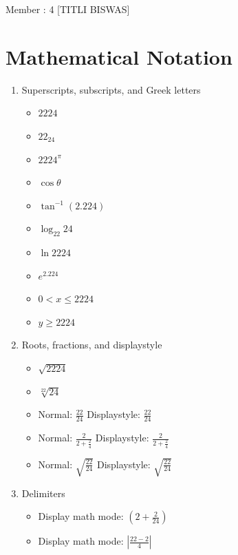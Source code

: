 \documentclass{article}
\begin{document}
\begin{center}
    {\LARGE Member : 4 [TITLI BISWAS]}
\end{center}

\section{Mathematical Notation}

\begin{enumerate}
    \item Superscripts, subscripts, and Greek letters
    \begin{itemize}
        \item $2224$
        \item $22_{24}$
        \item $2224^{\pi}$
        \item $\cos \theta$
        \item $\tan^{-1}(2.224)$
        \item $\log_{22}24$
        \item $\ln 2224$
        \item $e^{2.224}$
        \item $0 < x \leq 2224$
        \item $y \geq 2224$
    \end{itemize}

    \item Roots, fractions, and displaystyle
    \begin{itemize}
        \item $\sqrt{2224}$
        \item $\sqrt[22]{24}$
        \item Normal: $\frac{22}{24}$ Displaystyle: $\displaystyle\frac{22}{24}$
        \item Normal: $\frac{2}{2+ \frac{2}{4}}$ Displaystyle: $\displaystyle\frac{2}{2+ \frac{2}{4}}$
        \item Normal: $\sqrt{\frac{22}{24}}$ Displaystyle: $\displaystyle\sqrt{\frac{22}{24}}$
    \end{itemize}

    \item Delimiters
    \begin{itemize}
        \item Display math mode: $\displaystyle\left(2 + \frac{2}{24}\right)$
        \item Display math mode: $\displaystyle\left|\frac{22 - 2}{4}\right|$
    \end{itemize}


\end{enumerate}
\end{document}
